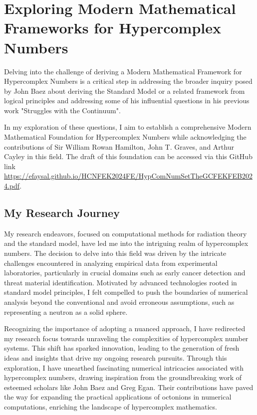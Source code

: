 \documentclass{article}
\begin{document}
\section{Exploring Modern Mathematical Frameworks for Hypercomplex Numbers}

Delving into the challenge of deriving a Modern Mathematical Framework for Hypercomplex Numbers is a critical step in addressing the broader inquiry posed by John Baez about deriving the Standard Model or a related framework from logical principles and addressing some of his influential questions in his previous work "Struggles with the Continuum".

In my exploration of these questions, I aim to establish a comprehensive Modern Mathematical Foundation for Hypercomplex Numbers while acknowledging the contributions of Sir William Rowan Hamilton, John T. Graves, and Arthur Cayley in this field. The draft of this foundation can be accessed via this GitHub link \url{https://efaysal.github.io/HCNFEK2024FE/HypComNumSetTheGCFEKFEB2024.pdf}.

\subsection*{My Research Journey}
My research endeavors, focused on computational methods for radiation theory and the standard model, have led me into the intriguing realm of hypercomplex numbers. The decision to delve into this field was driven by the intricate challenges encountered in analyzing empirical data from experimental laboratories, particularly in crucial domains such as early cancer detection and threat material identification. Motivated by advanced technologies rooted in standard model principles, I felt compelled to push the boundaries of numerical analysis beyond the conventional and avoid erroneous assumptions, such as representing a neutron as a solid sphere.

Recognizing the importance of adopting a nuanced approach, I have redirected my research focus towards unraveling the complexities of hypercomplex number systems. This shift has sparked innovation, leading to the generation of fresh ideas and insights that drive my ongoing research pursuits. Through this exploration, I have unearthed fascinating numerical intricacies associated with hypercomplex numbers, drawing inspiration from the groundbreaking work of esteemed scholars like John Baez and Greg Egan. Their contributions have paved the way for expanding the practical applications of octonions in numerical computations, enriching the landscape of hypercomplex mathematics.
\end{document}
